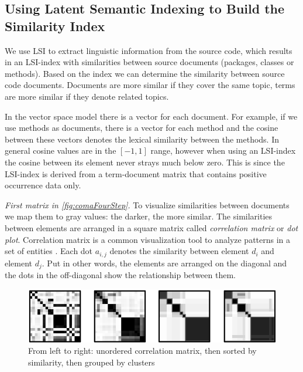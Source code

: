 \subsection{Using Latent Semantic Indexing to Build the Similarity Index}
\label{sec:lsi}

We use LSI to extract linguistic information from the source code, which results in an LSI-index with similarities between source documents (\ie packages, classes or methods). Based on the index we can determine the similarity between source code documents. Documents are more similar if they cover the same topic, terms are more similar if they denote related topics.

In the vector space model there is a vector for each document. For example, if we use methods as documents, there is a vector for each method and the cosine between these vectors denotes the lexical similarity between the methods. In general cosine values are in the $[-1,1]$ range, however when using an LSI-index the cosine between its element never strays much below zero. This is since the LSI-index is derived from a term-document matrix that contains positive occurrence data only.

\emph{First matrix in \autoref{fig:comaFourStep}.} To visualize similarities between documents we map them to gray values: the darker, the more similar. The similarities between elements are arranged in a square matrix called \emph{correlation matrix} or \emph{dot plot}. Correlation matrix is a common visualization tool to analyze patterns in a set of entities \cite{Ling73a}. Each dot $a_{i,j}$ denotes the similarity between element $d_i$ and element $d_j$. Put in other words, the elements are arranged on the diagonal and the dots in the off-diagonal show the relationship between them.

\begin{figure}[h]
  \includegraphics[width=\linewidth]{fig/hapax-clustering-example}
  \caption{From left to right: unordered correlation matrix, then sorted by similarity, then grouped by clusters}\label{fig:comaFourStep}
\end{figure}

